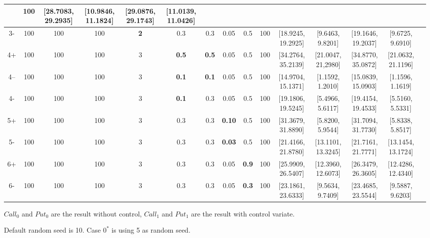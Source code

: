 \documentclass[11pt,a4paper]{article}
\begin{document}
\begin{table}[h]
{\begin{tabular}{|c|c|c|c|c|c|c|c|c|c|c|c|c|c|c|}
            & 100 
            & [28.7083, 29.2935] & [10.9846, 11.1824] 
            & [29.0876, 29.1743] & [11.0139, 11.0426]\\
            \hline
            3- & 100 & 100 & 100 & \textbf{2} & 0.3 & 0.3 & 0.05 & 0.5 
            & 100 
            & [18.9245, 19.2925] & [9.6463, 9.8201] 
            & [19.1646, 19.2037] & [9.6725, 9.6910]\\
            \hline
            4+ & 100 & 100 & 100 & 3 & \textbf{0.5} & \textbf{0.5} & 0.05 & 0.5 
            & 100
            & [34.2764, 35.2139] & [21.0047, 21,2980]
            & [34.8770, 35.0872] & [21.0632, 21.1196]\\
            \hline
            4--& 100 & 100 & 100 & 3 & \textbf{0.1} & \textbf{0.1} & 0.05 & 0.5 
            & 100
            & [14.9704, 15.1371] & [1.1592, 1.2010]
            & [15.0839, 15.0903] & [1.1596, 1.1619]\\
            \hline
            4- & 100 & 100 & 100 & 3 & \textbf{0.1} & 0.3 & 0.05 & 0.5 
            & 100
            & [19.1806, 19.5245] & [5.4966, 5.6117]
            & [19.4154, 19.4533] & [5.5160, 5.5331]\\
            \hline
            5+ & 100 & 100 & 100 & 3 & 0.3 & 0.3 & \textbf{0.10} & 0.5 
            & 100
            & [31.3679, 31.8890] & [5.8200, 5.9544] 
            & [31.7094, 31.7730] & [5.8338, 5.8517]\\
            \hline
            5- & 100 & 100 & 100 & 3 & 0.3 & 0.3 & \textbf{0.03} & 0.5 
            & 100
            & [21.4166, 21.8780] & [13.1101, 13.3245]
            & [21.7161, 21.7771] & [13.1454, 13.1724]\\
            \hline
            6+ & 100 & 100 & 100 & 3 & 0.3 & 0.3 & 0.05 & \textbf{0.9}
            & 100
            & [25.9909, 26.5407] & [12.3960, 12.6073]
            & [26.3479, 26.3605] & [12.4286, 12.4340]\\
            \hline
            6- & 100 & 100 & 100 & 3 & 0.3 & 0.3 & 0.05 & \textbf{0.3}
            & 100
            & [23.1861, 23.6333] & [9.5634, 9.7409]
            & [23.4685, 23.5544] & [9.5887, 9.6203]\\
            \hline
    \end{tabular}
        }
        \footnotesize

    $Call_0$ and $Put_0$ are the result without control,
    $Call_1$ and $Put_1$ are the result with control variate.

    Default random seed is 10. 
    Case $0^*$ is using 5 as random seed.
    \end{table}
\end{document}
